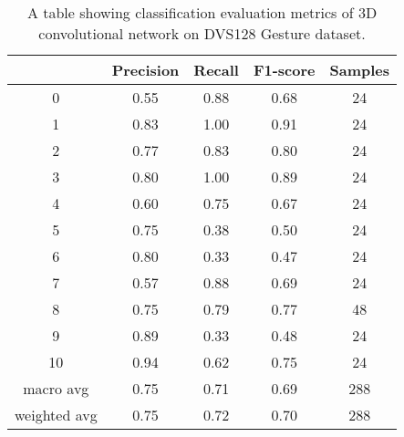 \begin{table}[htb]
    \centering
    \begin{tabular}{|| c | c | c | c | c ||}
        \hline
            & Precision & Recall & F1-score & Samples \\
        \hline
        \hline
        0            & 0.55 & 0.88 & 0.68 & 24  \\
        \hline
        1            & 0.83 & 1.00 & 0.91 & 24  \\
        \hline
        2            & 0.77 & 0.83 & 0.80 & 24  \\
        \hline
        3            & 0.80 & 1.00 & 0.89 & 24  \\
        \hline
        4            & 0.60 & 0.75 & 0.67 & 24  \\
        \hline
        5            & 0.75 & 0.38 & 0.50 & 24  \\
        \hline
        6            & 0.80 & 0.33 & 0.47 & 24  \\
        \hline
        7            & 0.57 & 0.88 & 0.69 & 24  \\
        \hline
        8            & 0.75 & 0.79 & 0.77 & 48  \\
        \hline
        9            & 0.89 & 0.33 & 0.48 & 24  \\
        \hline
        10           & 0.94 & 0.62 & 0.75 & 24  \\
        \hline
        macro avg    & 0.75 & 0.71 & 0.69 & 288 \\
        \hline
        weighted avg & 0.75 & 0.72 & 0.70 & 288 \\
        \hline
    \end{tabular}
    \caption{A table showing classification evaluation metrics of 3D convolutional network on DVS128 Gesture dataset.}
    \label{tab:conv3d_dvs128_evaluation_metrics}
\end{table}

